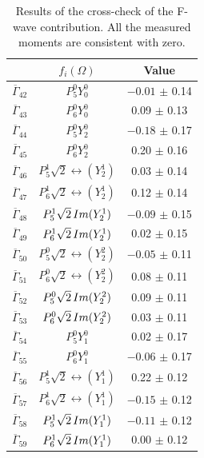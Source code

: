 \begin{table}[!htb]
\centering
\begin{tabular}{l|c|c}
& $f_{i}(\Omega)$ & Value \\
\hline
$\overline{\Gamma}_{42}$ & $P_{5}^{0}Y_{0}^{0}$ & $-0.01$ $\pm$ 0.14 \\ 
$\overline{\Gamma}_{43}$ & $P_{6}^{0}Y_{0}^{0}$ & \hphantom{$-$}0.09 $\pm$ 0.13 \\ 
$\overline{\Gamma}_{44}$ & $P_{5}^{0}Y_{2}^{0}$ & $-0.18$ $\pm$ 0.17 \\ 
$\overline{\Gamma}_{45}$ & $P_{6}^{0}Y_{2}^{0}$ & \hphantom{$-$}0.20 $\pm$ 0.16 \\ 
$\overline{\Gamma}_{46}$ & $P_{5}^{1}\sqrt{2}\rel(Y_{2}^{1})$ & \hphantom{$-$}0.03 $\pm$ 0.14 \\ 
$\overline{\Gamma}_{47}$ & $P_{6}^{1}\sqrt{2}\rel(Y_{2}^{1})$ & \hphantom{$-$}0.12 $\pm$ 0.14 \\ 
$\overline{\Gamma}_{48}$ & $P_{5}^{1}\sqrt{2}\, Im(Y_{2}^{1})$ & $-0.09$ $\pm$ 0.15 \\ 
$\overline{\Gamma}_{49}$ & $P_{6}^{1}\sqrt{2}\, Im(Y_{2}^{1})$ & \hphantom{$-$}0.02 $\pm$ 0.15 \\ 
$\overline{\Gamma}_{50}$ & $P_{5}^{0}\sqrt{2}\rel(Y_{2}^{2})$ & $-0.05$ $\pm$ 0.11 \\ 
$\overline{\Gamma}_{51}$ & $P_{6}^{0}\sqrt{2}\rel(Y_{2}^{2})$ & \hphantom{$-$}0.08 $\pm$ 0.11 \\ 
$\overline{\Gamma}_{52}$ & $P_{5}^{0}\sqrt{2}\, Im(Y_{2}^{2})$ & \hphantom{$-$}0.09 $\pm$ 0.11 \\ 
$\overline{\Gamma}_{53}$ & $P_{6}^{0}\sqrt{2}\, Im(Y_{2}^{2})$ & \hphantom{$-$}0.03 $\pm$ 0.11 \\ 
$\overline{\Gamma}_{54}$ & $P_{5}^{0}Y_{1}^{0}$ & \hphantom{$-$}0.02 $\pm$ 0.17 \\ 
$\overline{\Gamma}_{55}$ & $P_{6}^{0}Y_{1}^{0}$ & $-0.06$ $\pm$ 0.17 \\ 
$\overline{\Gamma}_{56}$ & $P_{5}^{1}\sqrt{2}\rel(Y_{1}^{1})$ & \hphantom{$-$}0.22 $\pm$ 0.12 \\ 
$\overline{\Gamma}_{57}$ & $P_{6}^{1}\sqrt{2}\rel(Y_{1}^{1})$ & $-0.15$ $\pm$ 0.12 \\ 
$\overline{\Gamma}_{58}$ & $P_{5}^{1}\sqrt{2}\, Im(Y_{1}^{1})$ & $-0.11$ $\pm$ 0.12 \\ 
$\overline{\Gamma}_{59}$ & $P_{6}^{1}\sqrt{2}\, Im(Y_{1}^{1})$ & \hphantom{$-$}0.00 $\pm$ 0.12 \\ 
\end{tabular}
\caption{Results of the cross-check of the F-wave contribution. All the measured moments are consistent with zero.}
\label{fig:kpimm:angular-analysis:f-wave:tab}
\end{table}

